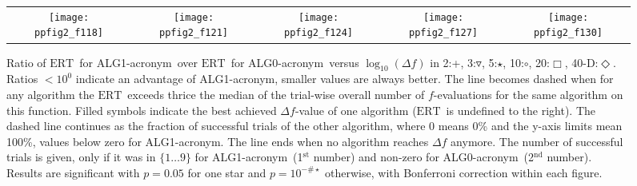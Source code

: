 \documentclass{article}
\newcommand{\ERT}{\ensuremath{\mathrm{ERT}}}
\newcommand{\Df}{\ensuremath{\Delta f}}
\newcommand{\bbobdatapath}{ppdata/} %
\newcommand{\algorithmA}{ALG0-acronym}  %
\newcommand{\algorithmB}{ALG1-acronym}   %
\begin{document}
\begin{figure}
\begin{tabular}{@{}c@{}c@{}c@{}c@{}c@{}}
\texttt{[image: ppfig2\_f118]}&
\texttt{[image: ppfig2\_f121]}&
\texttt{[image: ppfig2\_f124]}&
\texttt{[image: ppfig2\_f127]}&
\texttt{[image: ppfig2\_f130]}
\end{tabular}
\vspace*{-0.2cm}
\caption{\label{fig:ERTratiographs}Ratio of \ERT\ for \algorithmB\ over \ERT\ for
\algorithmA\ versus $\log_{10}(\Df)$ in
  2:{\color{cyan}+},
  3:{\color{green!45!black}$\triangledown$},
  5:{\color{blue}$\star$}, 
 10:$\circ$, 
 20:{\color{red}$\Box$}, 
 40-D:{\color{magenta}$\Diamond$}.
Ratios $<10^0$ indicate an advantage of \algorithmB, smaller
values are always better. The line becomes dashed when for any algorithm the \ERT\ exceeds thrice the median
of the trial-wise overall number of $f$-evaluations for the same algorithm on this function.
Filled symbols indicate the best achieved $\Df$-value of one algorithm (\ERT\ is undefined to the right).
The dashed line continues as the fraction of successful trials of the other
algorithm, where 0 means 0\% and the y-axis limits mean 100\%, values below
zero for \algorithmB. The line ends when no algorithm reaches $\Df$ anymore. 
The number of successful trials is given, only if it was in $\{1\dots9\}$ for
\algorithmB\ (1$^{\textrm{st}}$ number) and non-zero for \algorithmA\ (2$^{\textrm{nd}}$ number).
Results are significant with $p=0.05$ for one star and $p=10^{-\#\star}$
otherwise, with Bonferroni correction within each figure.}
\end{figure}
\begin{table}
\centering
\tiny

\caption{\label{tab:ERTs05Da} 
}
\end{table}
\end{document}
